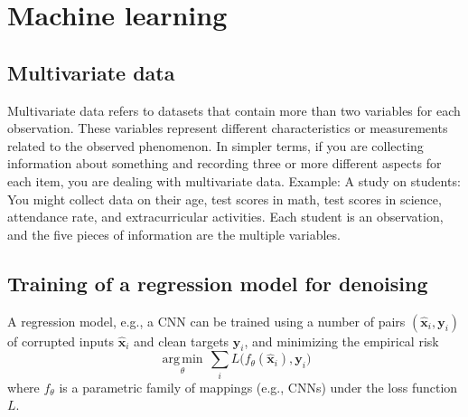 \chapter{Machine learning}

\section{Multivariate data}

Multivariate data refers to datasets that contain more than two
variables for each observation. These variables represent different
characteristics or measurements related to the observed phenomenon. In
simpler terms, if you are collecting information about something and
recording three or more different aspects for each item, you are
dealing with multivariate data. Example: A study on students: You
might collect data on their age, test scores in math, test scores in
science, attendance rate, and extracurricular activities. Each student
is an observation, and the five pieces of information are the multiple
variables.


\section{Training of a regression model for denoising} %
A regression model, e.g., a \gls{CNN} can be trained using a number of pairs $(\hat{{\mathbf x}}_i, {\mathbf y}_i)$ of corrupted inputs $\hat{{\mathbf x}}_i$ and clean targets ${\mathbf y}_i$, and minimizing the empirical risk
\begin{equation}
  \underset{\theta}{\operatorname{arg\,min}} \, \sum_i L \big(f_\theta(\hat{\mathbf x}_i), {\mathbf y}_i\big)
  \label{eq:supervised_learning}
\end{equation}
where $f_\theta$ is a parametric family of mappings (e.g., CNNs) under the loss function $L$.

